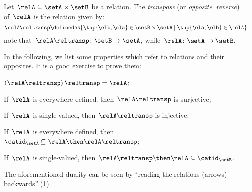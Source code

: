 \begin{definition}
  \label{def:relation-transpose}
  Let~$\relA\subseteq \setA\times \setB$ be a relation. The \emph{transpose} (or \emph{opposite}, \emph{reverse}) of~$\relA$ is the relation given by:
  \begin{equation*}
    \relA\reltransp \definedas \{\tup{\elb,\ela}\in \setB\times \setA \mid \tup{\ela,\elb}\in \relA \}.
  \end{equation*}
  note that~$\relA\reltransp\colon \setB\to \setA$, while~$\relA\colon \setA\to \setB$.
\end{definition}
\begin{remark}
  In the following, we list some properties which refer to relations and their opposites. It is a good exercise to prove them:
  \begin{compactitem}
    \item $\left(\relA\reltransp\right)\reltransp = \relA $;
    \item If~$\relA$ is everywhere-defined, then~$\relA\reltransp$ is surjective;
    \item If~$\relA$ is single-valued, then~$\relA\reltransp$ is injective.
    \item If~$\relA$ is everywhere defined, then~$\catid_\setA\subseteq \relA\then \relA\reltransp$;
    \item If~$\relA$ is single-valued, then~$\relA\reltransp\then \relA\subseteq \catid_\setB$.
  \end{compactitem}
\end{remark}


\begin{remark}
  The aforementioned duality can be seen by ``reading the relations (arrows) backwards'' (\cref{fig:rel_transpose}).
\end{remark}

\begin{figure}[h!]
  \centering
  \caption{}
  \label{fig:rel_transpose}
\end{figure}

